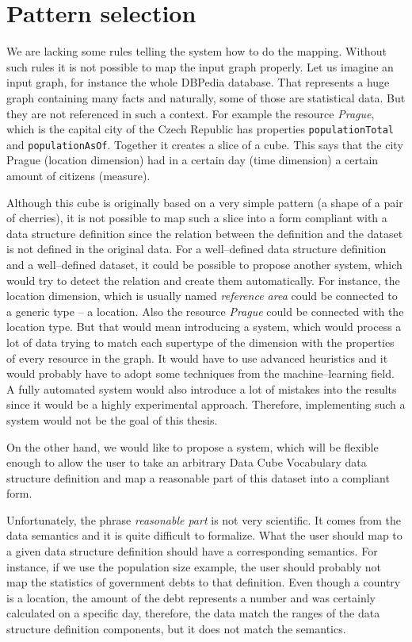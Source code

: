 \section{Pattern selection}
We are lacking some rules telling the system how to do the mapping. 
Without such rules it is not possible to map the input graph properly. Let us 
imagine an input graph, for instance the whole DBPedia database. That represents a huge graph 
containing many facts and naturally, some of those are statistical data. But they 
are not referenced in such a context. For example the resource \emph{Prague}, which is the 
capital city of the Czech Republic has properties \texttt{populationTotal} and
\texttt{populationAsOf}. Together it creates a slice of a cube. This says that the 
city Prague (location dimension) had in a certain day (time dimension) 
a certain amount of citizens (measure).

Although this cube is originally based on a very simple pattern (a shape of a pair of cherries),
it is not possible to map such a slice into a form compliant with a 
data structure definition since the relation between the definition and the 
dataset is not defined in the original data. For a well--defined data structure 
definition and a well--defined dataset, it could be possible to propose another 
system, which would try to detect the relation and create them 
automatically. For instance, the location dimension, which is usually named
\emph{reference area} could be connected to a generic type -- a location.
Also the resource \emph{Prague} could be connected with the location type. But 
that would mean introducing a system, which would process a lot of data trying to 
match each supertype of the dimension with the properties of every resource in 
the graph. It would have to use advanced heuristics and it would probably have 
to adopt some techniques from the machine--learning field. A fully automated 
system would also introduce a lot of mistakes into the results since it would 
be a highly experimental approach. Therefore, implementing such a system would 
not be the goal of this thesis. 

On the other hand, we would like to propose a system, which will be flexible 
enough to allow the user to take an arbitrary Data Cube Vocabulary data 
structure definition and map a reasonable part of this dataset into a compliant 
form.

Unfortunately, the phrase \emph{reasonable part} is not very scientific. 
It comes from the data semantics and it is quite difficult to formalize. What 
the user should map to a given data structure definition should have 
a corresponding semantics. For instance, if we use the population size example, the 
user should probably not map the statistics of government debts to that 
definition. Even though a country is a location, the amount of the debt represents a 
number and was certainly calculated on a specific day, therefore, the 
data match the ranges of the data structure definition components, but it does 
not match the semantics.


